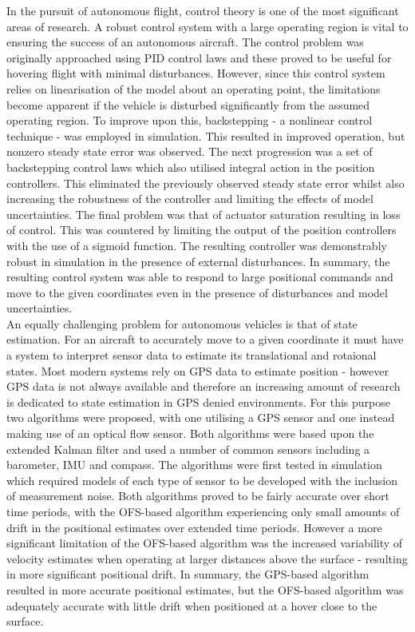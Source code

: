 In the pursuit of autonomous flight, control theory is one of the most significant areas of research. A robust control system with a large operating region is vital to ensuring the success of an autonomous aircraft. The control problem was originally approached using PID control laws and these proved to be useful for hovering flight with minimal disturbances. However, since this control system relies on linearisation of the model about an operating point, the limitations become apparent if the vehicle is disturbed significantly from the assumed operating region. To improve upon this, backstepping - a nonlinear control technique - was employed in simulation. This resulted in improved operation, but nonzero steady state error was observed. The next progression was a set of backstepping control laws which also utilised integral action in the position controllers. This eliminated the previously observed steady state error whilst also increasing the robustness of the controller and limiting the effects of model uncertainties. The final problem was that of actuator saturation resulting in loss of control. This was countered by limiting the output of the position controllers with the use of a sigmoid function. The resulting controller was demonstrably robust in simulation in the presence of external disturbances. In summary, the resulting control system was able to respond to large positional commands and move to the given coordinates even in the presence of disturbances and model uncertainties.\\

An equally challenging problem for autonomous vehicles is that of state estimation. For an aircraft to accurately move to a given coordinate it must have a system to interpret sensor data to estimate its translational and rotaional states. Most modern systems rely on GPS data to estimate position - however GPS data is not always available and therefore an increasing amount of research is dedicated to state estimation in GPS denied environments. For this purpose two algorithms were proposed, with one utilising a GPS sensor and one instead making use of an optical flow sensor. Both algorithms were based upon the extended Kalman filter and used a number of common sensors including a barometer, IMU and compass. The algorithms were first tested in simulation which required models of each type of sensor to be developed with the inclusion of measurement noise. Both algorithms proved to be fairly accurate over short time periods, with the OFS-based algorithm experiencing only small amounts of drift in the positional estimates over extended time periods. However a more significant limitation of the OFS-based algorithm was the increased variability of velocity estimates when operating at larger distances above the surface - resulting in more significant positional drift. In summary, the GPS-based algorithm resulted in more accurate positional estimates, but the OFS-based algorithm was adequately accurate with little drift when positioned at a hover close to the surface.\\

